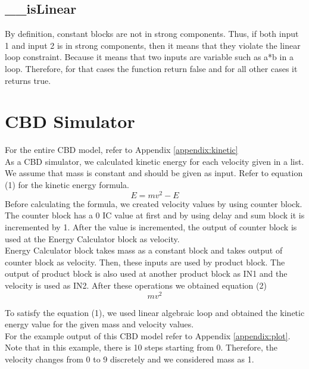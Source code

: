 \documentclass{article}
\begin{document}
\subsection{\_\_isLinear}

By definition, constant blocks are not in strong components. Thus, if both input 1 and input 2 is in strong components, then it means that they violate the linear loop constraint. Because it means that two inputs are variable such as a*b in a loop.  Therefore, for that cases the function return false and for all other cases it returns true.
\section{CBD Simulator}
For the entire CBD model, refer to Appendix \ref{appendix:kinetic} \\
As a CBD simulator, we calculated kinetic energy for each velocity given in a list. 
We assume that mass is constant and should be given as input. Refer to equation (1) for the kinetic energy formula.
\begin{equation}
E=mv^2-E
\end{equation}
Before calculating the formula, we created velocity values by using counter block. The counter block has a 0 IC value at first and by using delay and sum block it is incremented by 1. After the value is incremented, the output of counter block is used at the Energy Calculator block as velocity. \\

Energy Calculator block takes mass as a constant block and takes output of counter block as velocity. Then, these inputs are used by product block. The output of product block is also used at another product block as IN1 and the velocity is used as IN2. After these operations we obtained equation (2)\\
\begin{equation}
mv^2
\end{equation}

To satisfy the equation (1), we used linear algebraic loop and obtained the kinetic energy value for the given mass and velocity values. \\

For the example output of this CBD model refer to Appendix \ref{appendix:plot}. Note that in this example, there is 10 steps starting from 0. Therefore, the velocity changes from 0 to 9 discretely and we considered mass as 1.
\end{document}
